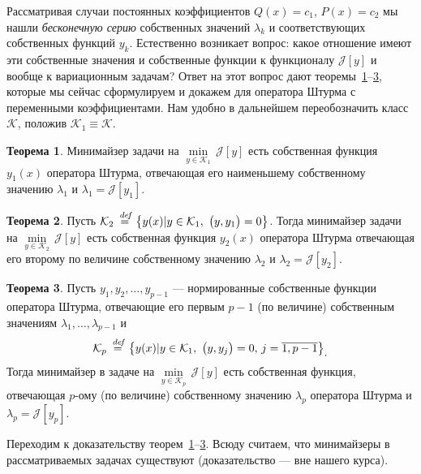 \documentclass[12pt,a4paper,openany,fleqn]{book}
\newcommand {\defeq}{\stackrel{\hspace{0.09 cm}de\!f}{=}}
\newcommand {\eqdef}{\defeq}
\newcommand{\J}{\ensuremath{\mathcal{J}}}
\newcommand{\mc}[1]{\ensuremath{\mathcal{#1}}}
\newcommand{\K}{\mc{K}}
\theoremstyle{definition}
\newtheorem{_teor}{Теорема}[section]
\begin{document}
Рассматривая случаи постоянных коэффициентов $Q(x)=c_1$, $P(x)=c_2$ мы нашли \emph{бесконечную серию} собственных значений $\lambda_k$ и соответствующих собственных функций $y_k$. Естественно возникает вопрос: какое отношение имеют эти собственные значения и собственные функции к функционалу $\J[y]$ и вообще к вариационным задачам? Ответ на этот вопрос дают теоремы~\ref{l5:s2:teor:1}--\ref{l5:s2:teor:3}, которые мы сейчас сформулируем и докажем для оператора Штурма с переменными коэффициентами. Нам удобно в дальнейшем переобозначить класс \K, положив $\K_1\equiv\K$.
\begin{_teor}
	\label{l5:s2:teor:1}
	Минимайзер задачи на $\displaystyle\min\limits_{y\in\K_1}\,\J[y]$ есть собственная функция $y_1(x)$ оператора Штурма, отвечающая его наименьшему собственному значению $\lambda_1$ и $\lambda_1=\J[y_1]$.
\end{_teor}
\begin{_teor}
	\label{l5:s2:teor:2}
	Пусть $\displaystyle\K_2\eqdef\left\{y(x)|y\in\K_1,\ \big(y,y_1\big)=0\right\}$. Тогда минимайзер задачи на $\displaystyle\min\limits_{y\in\K_2}\,\J[y]$ есть собственная функция $y_2(x)$ оператора Штурма отвечающая его второму по величине собственному значению $\lambda_2$ и $\lambda_2=\J[y_2]$.
\end{_teor}
\begin{_teor}
	\label{l5:s2:teor:3}
	Пусть $y_1,y_2,\ldots,y_{p-1}$ --- нормированные собственные функции оператора Штурма, отвечающие его первым $p-1$ (по величине) собственным значениям $\lambda_1,\ldots,\lambda_{p-1}$ и 
	\begin{equation*}
		\hfill\displaystyle\K_p\eqdef\left\{y(x)|y\in\K_1,\ \big(y,y_j\big)=0,\,j=\overline{1,p-1}\right\}_{\displaystyle.}\hfill
	\end{equation*}
Тогда минимайзер в задаче на $\displaystyle\min\limits_{y\in\K_p}\,\J[y]$ есть собственная функция, отвечающая $p$-ому (по величине) собственному значению $\lambda_p$ оператора Штурма и $\lambda_p=\J[y_p]$.  
\end{_teor}
Переходим к доказательству теорем~\ref{l5:s2:teor:1}--\ref{l5:s2:teor:3}. 	Всюду считаем, что минимайзеры в рассматриваемых задачах существуют (доказательство --- вне нашего курса). 
\end{document}
